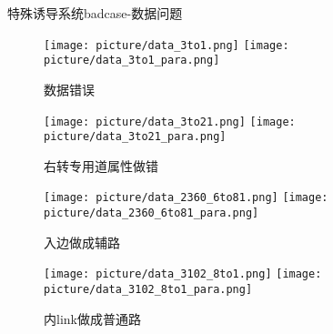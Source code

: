 \documentclass[10pt]{beamer}
\begin{document}
\begin{frame}{特殊诱导系统badcase-数据问题}
	\begin{figure}
		\begin{minipage}[htbp]{0.45\textwidth}
			\centering
				\texttt{[image: picture/data\_3to1.png]}
				\texttt{[image: picture/data\_3to1\_para.png]}
				\caption{数据错误}
		\end{minipage}
					\begin{minipage}[htbp]{0.45\textwidth}
						\centering
						\texttt{[image: picture/data\_3to21.png]}
						\texttt{[image: picture/data\_3to21\_para.png]}
						\caption{右转专用道属性做错}
					\end{minipage}

					\begin{minipage}[htbp]{0.45\textwidth}
						\centering
						\texttt{[image: picture/data\_2360\_6to81.png]}
						\texttt{[image: picture/data\_2360\_6to81\_para.png]}
						\caption{入边做成辅路}
					\end{minipage}	
					\begin{minipage}[htbp]{0.45\textwidth}
						\centering
						\texttt{[image: picture/data\_3102\_8to1.png]}
						\texttt{[image: picture/data\_3102\_8to1\_para.png]}
						\caption{内link做成普通路}
					\end{minipage}	
	\end{figure}	
\end{frame}
\end{document}
